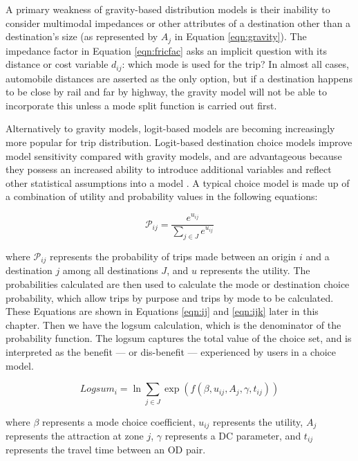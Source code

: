 A primary weakness of gravity-based distribution models is their inability to
consider multimodal impedances or other attributes of a destination other than
a destination's size (as represented by $A_j$ in Equation \ref{eqn:gravity}). The
impedance factor in Equation \ref{eqn:fricfac} asks an implicit question with its
distance or cost variable $d_{ij}$: which mode is used for the trip? In almost
all cases, automobile distances are asserted as the only option, but if a
destination happens to be close by rail and far by highway, the gravity model
will not be able to incorporate this unless a mode split function is carried out first.

Alternatively to gravity models, logit-based models are becoming
increasingly more popular for trip distribution. Logit-based destination choice models improve model
sensitivity compared with gravity models, and are advantageous because
they possess an increased ability to introduce additional variables and reflect
other statistical assumptions into a model \citep{tfr2021}. A typical choice
model is made up of a combination of utility and probability values in the
following equations:

\begin{equation}
\mathcal{P}_{ij} = \frac{e^{u_{ij}}}{\sum_{j\in J}e^{u_{ij}}}
  \label{eqn:probability}
\end{equation}

\noindent where $\mathcal{P}_{ij}$ represents the probability of trips made between an
origin \(i\) and a destination \(j\) among all destinations $J$, and \(u\) represents the utility. The probabilities
calculated are then used to calculate the mode or destination choice probability,
which allow trips by purpose and trips by mode to be calculated. These Equations
are shown in Equations \ref{eqn:ij} and \ref{eqn:ijk} later in this chapter. Then
we have the logsum calculation, which is the denominator of the probability function.
The logsum captures the total value of the choice set, and is interpreted as the
benefit --- or dis-benefit --- experienced by users in a choice model.

\begin{equation}
 Logsum_{i} = \ln\sum_{j\in J}\exp(f(\beta, u_{ij}, A_j, \gamma, t_{ij}))
  \label{eqn:logsum}
\end{equation}

\noindent where $\beta$ represents a mode choice coefficient, $u_{ij}$ represents the utility,
$A_j$ represents the attraction at zone $j$, $\gamma$ represents
a DC parameter, and $t_{ij}$ represents the travel time between an OD pair.

